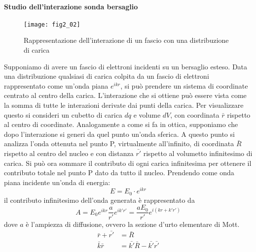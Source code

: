 \paragraph{Studio dell'interazione sonda bersaglio}
\begin{figure}[h]
\centering
\texttt{[image: fig2\_02]}
\caption{Rappresentazione dell'interazione di un fascio con una distribuzione di carica}
\label{fig:2.02}
\end{figure}
Supponiamo di avere un fascio di elettroni incidenti su un bersaglio esteso.
Data una distribuzione qualsiasi di carica colpita da un fascio di elettroni rappresentato come un'onda piana $e^{ikr}$, si può prendere un sistema di coordinate centrato al centro della carica.
L'interazione che si ottiene può essere vista come la somma di tutte le interazioni derivate dai punti della carica. 
Per visualizzare questo si consideri un cubetto di carica $dq$ e volume $dV$, con coordinata $\bar r$ rispetto al centro di coordinate. 
Analogamente a come si fa in ottica, supponiamo che dopo l'interazione si generi da quel punto un'onda sferica.
A questo punto si analizza l'onda ottenuta nel punto P, virtualmente all'infinito, di coordinata $\bar{R}$ rispetto al centro del nucleo e con distanza $\bar{r'}$ rispetto al volumetto infinitesimo di carica.
Si può ora sommare il contributo di ogni carica infinitesima per ottenere il contributo totale nel punto P dato da tutto il nucleo.
Prendendo come onda piana incidente un'onda di energia:
\begin{equation}
E=E_0\cdot e^{ikr}
\end{equation}
il contributo infinitesimo dell'onda generata è rappresentato da
\begin{equation}
A=E_0 e^{ikr}\frac{a}{r'}e^{ik'r'}=\frac{aE_0}{r'}e^{i(kr+k'r')}
\end{equation}
dove $a$ è l'ampiezza di diffusione, ovvero la sezione d'urto elementare di Mott.
\begin{equation}
\begin{split}
\bar{r}+\bar{r'}&=\bar{R}\\
\bar{k}\bar{r}&=\bar{k'}\bar{R}-\bar{k'}\bar{r'}\\
\end{split}
\end{equation}

